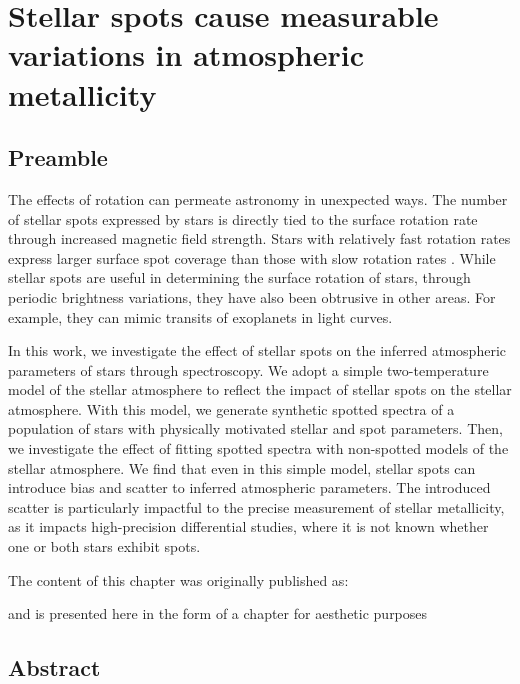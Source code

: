 


\chapter{Stellar spots cause measurable variations in atmospheric metallicity}
\label{chap:stellar_spots}

\section*{Preamble}

The effects of rotation can permeate astronomy in unexpected ways.
The number of stellar spots expressed by stars is directly tied to the surface rotation rate through increased magnetic field strength.
Stars with relatively fast rotation rates express larger surface spot coverage than those with slow rotation rates \citep{cao_starspots_2022}.
While stellar spots are useful in determining the surface rotation of stars, through periodic brightness variations, they have also been obtrusive in other areas.
For example, they can mimic transits of exoplanets in light curves.

In this work, we investigate the effect of stellar spots on the inferred atmospheric parameters of stars through spectroscopy.
We adopt a simple two-temperature model of the stellar atmosphere to reflect the impact of stellar spots on the stellar atmosphere.
With this model, we generate synthetic spotted spectra of a population of stars with physically motivated stellar and spot parameters.
Then, we investigate the effect of fitting spotted spectra with non-spotted models of the stellar atmosphere.
We find that even in this simple model, stellar spots can introduce bias and scatter to inferred atmospheric parameters.
The introduced scatter is particularly impactful to the precise measurement of stellar metallicity, as it impacts high-precision differential studies, where it is not known whether one or both stars exhibit spots.


The content of this chapter was originally published as:
\begin{quote}
	\citet*{tanner_ss}
\end{quote}
and is presented here in the form of a chapter for aesthetic purposes 

\newpage

\section*{Abstract}

